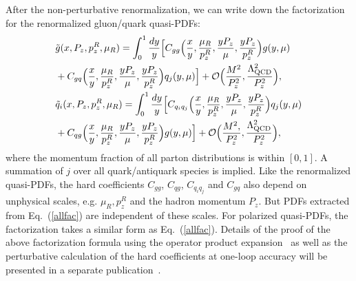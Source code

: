 After the non-perturbative renormalization, we can write down the factorization for the renormalized gluon/quark quasi-PDFs:
\begin{align}\label{allfac}
&\tilde g(x ,P_z, p_z^R, \mu_R)=\int_0^1\frac{dy}{y}\Big[C_{gg}\Big(\frac{x}{y}, \frac{\mu_R}{p_z^R},\frac{y P_z}{\mu}, \frac{y P_z}{p_z^R}\Big)g(y, \mu)\nonumber\\
&+C_{gq}\Big(\frac{x}{y}, \frac{\mu_R}{p_z^R},\frac{y P_z}{\mu}, \frac{y P_z}{p_z^R}\Big)q_j(y, \mu)\Big]+\mathcal O\Big(\frac{M^2}{P_z^2}, \frac{\Lambda_{\rm QCD}^2}{P_z^2}\Big),\nonumber\\
&\tilde q_i(x ,P_z, p_z^R, \mu_R)=\int_0^1\frac{dy}{y}\Big[C_{q_i q_j}\Big(\frac{x}{y}, \frac{\mu_R}{p_z^R},\frac{y P_z}{\mu}, \frac{y P_z}{p_z^R}\Big)q_j(y, \mu)\nonumber\\
&+C_{qg}\Big(\frac{x}{y}, \frac{\mu_R}{p_z^R},\frac{y P_z}{\mu}, \frac{y P_z}{p_z^R}\Big)g(y, \mu)\Big]+\mathcal O\Big(\frac{M^2,}{P_z^2}, \frac{\Lambda_{\rm QCD}^2}{P_z^2}\Big),
\end{align}
where the momentum fraction of all parton distributions is within $[0,1]$. A summation of $j$ over all quark/antiquark species is implied. Like the renormalized quasi-PDFs, the hard coefficients $C_{gg}$, $C_{qg}$, $C_{q_i q_j}$ and $C_{gq}$ also depend on unphysical scales, e.g. $\mu_R, p_z^R$ and the hadron momentum $P_z$. But PDFs extracted from Eq.~(\ref{allfac}) are independent of these scales. For polarized quasi-PDFs, the factorization takes a similar form as Eq.~(\ref{allfac}).
Details of the proof of the above factorization formula using the operator product expansion~\cite{Izubuchi:2018srq} as well as the perturbative calculation of the hard coefficients at one-loop accuracy will be presented in a separate publication~\cite{Todo:2018glu}.
